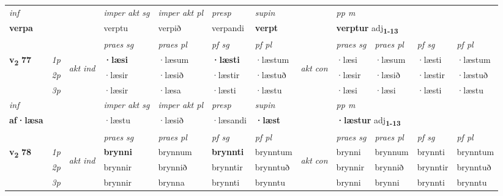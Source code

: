 \begin{longtable}[l]{X>{\footnotesize\itshape}llXXXXlXXXX}
   {\textit{inf}} & &  & \textit{imper akt sg} & \textit{imper akt pl}   & \textit{presp} & \textit{supin}  && \textit{pp m} \\*
   {\textbf{verpa}} & && verptu  & verpið   & verpandi &  \textbf{verpt}  && \multicolumn{2}{l}{\textbf{verptur} adj\textbf{\textsubscript{1-13}}} \\*

\midrule

 & &   & \textit{praes sg}  & \textit{praes pl}    & \textit{ pf sg} & \textit{pf pl} & & \textit{praes sg}  & \textit{praes pl}    & \textit{pf sg} & \textit{pf pl }  \\ \cmidrule{4-7} \cmidrule{9-12}
 \multirow{2}{*}{{{\textbf{v{\textsubscript{2}}} \Large{\textbf{77}}}}}  & 1p & \multirow{3}{*}{\begin{turn}{90}\textit{akt ind}\end{turn}} & \textbf{·læsi} & ·læsum & \textbf{·læsti} & ·læstum & \multirow{3}{*}{\begin{turn}{90}\textit{akt con}\end{turn}} &·læsi & ·læsum & ·læsti & ·læstum\\*
 & 2p &  &  ·læsir  & ·læsið & ·læstir & ·læstuð & & ·læsir & ·læsið & ·læstir & ·læstuð \\*
 & 3p &  & ·læsir & ·læsa & ·læsti & ·læstu & & ·læsi & ·læsi& ·læsti & ·læstu \\*
\cmidrule{4-7} \cmidrule{9-12}

   {\textit{inf}} & &  & \textit{imper akt sg} & \textit{imper akt pl}   & \textit{presp} & \textit{supin}  && \textit{pp m} \\*
  {\textbf{af\allowbreak ·læsa}} & && ·læstu  & ·læsið   & ·læsandi &  \textbf{·læst}  && \multicolumn{2}{l}{\textbf{·læstur} adj\textbf{\textsubscript{1-13}}} \\*

\midrule

 & &   & \textit{praes sg}  & \textit{praes pl}    & \textit{ pf sg} & \textit{pf pl} & & \textit{praes sg}  & \textit{praes pl}    & \textit{pf sg} & \textit{pf pl }  \\ \cmidrule{4-7} \cmidrule{9-12}
 \multirow{2}{*}{{{\textbf{v{\textsubscript{2}}} \Large{\textbf{78}}}}}  & 1p & \multirow{3}{*}{\begin{turn}{90}\textit{akt ind}\end{turn}} & \textbf{brynni} & brynnum & \textbf{brynnti} & brynntum & \multirow{3}{*}{\begin{turn}{90}\textit{akt con}\end{turn}} &brynni & brynnum & brynnti & brynntum\\*
 & 2p &  &  brynnir  & brynnið & brynntir & brynntuð & & brynnir & brynnið & brynntir & brynntuð \\*
 & 3p &  & brynnir & brynna & brynnti & brynntu & & brynni & brynni& brynnti & brynntu \\*
\cmidrule{4-7} \cmidrule{9-12}


\end{longtable}
